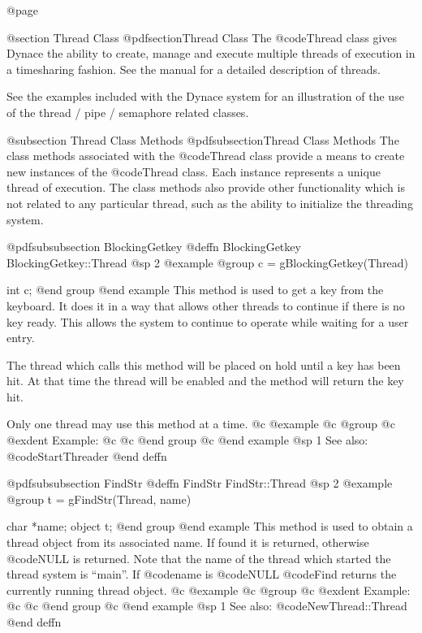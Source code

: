 @page

@section Thread Class
@pdfsection{Thread Class}
The @code{Thread} class gives Dynace the ability to create, manage and
execute multiple threads of execution in a timesharing fashion.  See the
manual for a detailed description of threads.


See the examples included with the Dynace system for an illustration of the
use of the thread / pipe / semaphore related classes.


@subsection Thread Class Methods
@pdfsubsection{Thread Class Methods}
The class methods associated with the @code{Thread} class provide a means
to create new instances of the @code{Thread} class.  Each instance
represents a unique thread of execution.  The class methods also provide
other functionality which is not related to any particular thread, such
as the ability to initialize the threading system.










@pdfsubsubsection {BlockingGetkey}
@deffn {BlockingGetkey} BlockingGetkey::Thread
@sp 2
@example
@group
c = gBlockingGetkey(Thread)

int     c;
@end group
@end example
This method is used to get a key from the keyboard.  It does it in a way
that allows other threads to continue if there is no key ready.  This
allows the system to continue to operate while waiting for a user entry.

The thread which calls this method will be placed on hold until a key
has been hit.  At that time the thread will be enabled and the method
will return the key hit.

Only one thread may use this method at a time.
@c @example
@c @group
@c @exdent Example:
@c 
@c @end group
@c @end example
@sp 1
See also:  @code{StartThreader}
@end deffn











@pdfsubsubsection {FindStr}
@deffn {FindStr} FindStr::Thread
@sp 2
@example
@group
t = gFindStr(Thread, name)

char    *name;
object  t;
@end group
@end example
This method is used to obtain a thread object from its associated name.
If found it is returned, otherwise @code{NULL} is returned.  Note
that the name of the thread which started the thread system is ``main''.
If @code{name} is @code{NULL} @code{Find} returns the currently running
thread object.
@c @example
@c @group
@c @exdent Example:
@c 
@c @end group
@c @end example
@sp 1
See also:  @code{NewThread::Thread}
@end deffn









